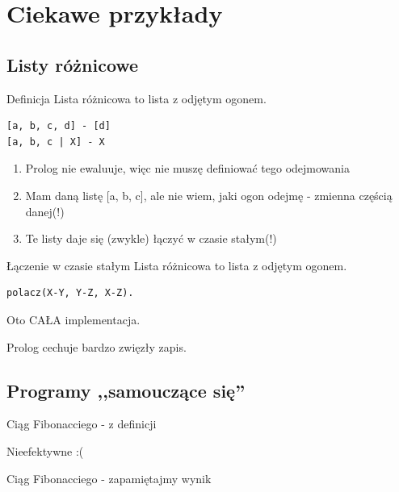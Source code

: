 \documentclass[blue]{beamer}
\begin{document}
\section{Ciekawe przykłady}
\subsection{Listy różnicowe}
\begin{frame}[fragile]{Definicja}
Lista różnicowa to lista z odjętym ogonem.
\begin{lstlisting}
[a, b, c, d] - [d]
[a, b, c | X] - X
\end{lstlisting}
\begin{enumerate}
\item Prolog nie ewaluuje, więc nie muszę definiować tego odejmowania
\item Mam daną listę [a, b, c], ale nie wiem, jaki ogon odejmę - zmienna częścią danej(!)
\item Te listy daje się (zwykle) łączyć w czasie stałym(!)
\end{enumerate}
\end{frame}
\begin{frame}[fragile]{Łączenie w czasie stałym}
Lista różnicowa to lista z odjętym ogonem.
\begin{lstlisting}
polacz(X-Y, Y-Z, X-Z).
\end{lstlisting}

Oto CAŁA implementacja.

Prolog cechuje bardzo zwięzły zapis.
\end{frame}
\subsection{Programy ,,samouczące się''}
\begin{frame}{Ciąg Fibonacciego - z definicji}


Nieefektywne :(
\end{frame}
\begin{frame}{Ciąg Fibonacciego - zapamiętajmy wynik}

\end{frame}
\end{document}
